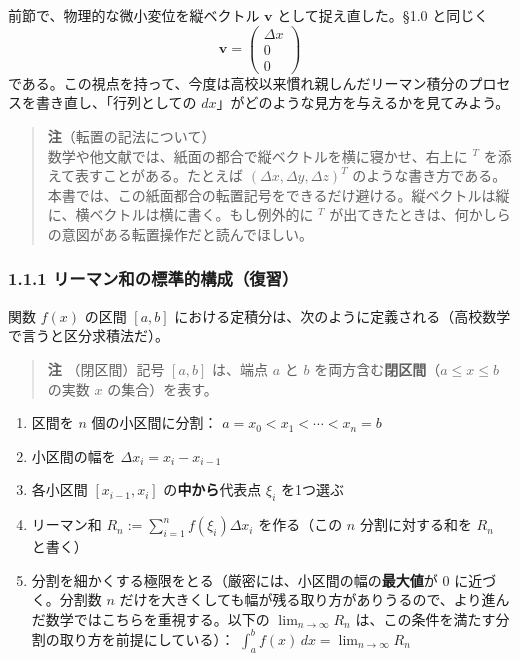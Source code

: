 \documentclass[a4paper,12pt,openany]{book}
\providecommand{\tightlist}{%
  \setlength{\itemsep}{0pt}\setlength{\parskip}{0pt}}
\begin{document}
前節で、物理的な微小変位を縦ベクトル \(\mathbf{v}\)
として捉え直した。§1.0 と同じく
\[\mathbf{v} = \begin{pmatrix} \Delta x \\ 0 \\ 0 \end{pmatrix}\]
である。この視点を持って、今度は高校以来慣れ親しんだリーマン積分のプロセスを書き直し、「行列としての
\(dx\)」がどのような見方を与えるかを見てみよう。

\begin{quote}
\textbf{注}（転置の記法について）\\
数学や他文献では、紙面の都合で縦ベクトルを横に寝かせ、右上に \({}^T\)
を添えて表すことがある。たとえば \((\Delta x,\Delta y,\Delta z)^T\)
のような書き方である。本書では、この紙面都合の転置記号をできるだけ避ける。縦ベクトルは縦に、横ベクトルは横に書く。もし例外的に
\({}^T\)
が出てきたときは、何かしらの意図がある転置操作だと読んでほしい。
\end{quote}

\hypertarget{ux30eaux30fcux30deux30f3ux548cux306eux6a19ux6e96ux7684ux69cbux6210ux5fa9ux7fd2}{%
\subsubsection{1.1.1
リーマン和の標準的構成（復習）}\label{ux30eaux30fcux30deux30f3ux548cux306eux6a19ux6e96ux7684ux69cbux6210ux5fa9ux7fd2}}

関数 \(f(x)\) の区間 \([a, b]\)
における定積分は、次のように定義される（高校数学で言うと区分求積法だ）。

\begin{quote}
\textbf{注} （閉区間）記号 \([a,b]\) は、端点 \(a\) と \(b\)
を両方含む\textbf{閉区間}（\(a \le x \le b\) の実数 \(x\)
の集合）を表す。
\end{quote}

\begin{enumerate}
\def\labelenumi{\arabic{enumi}.}
\tightlist
\item
  区間を \(n\) 個の小区間に分割： \(a = x_0 < x_1 < \cdots < x_n = b\)
\item
  小区間の幅を \(\Delta x_i = x_i - x_{i-1}\)
\item
  各小区間 \([x_{i-1}, x_i]\) の\textbf{中から}代表点 \(\xi_i\)
  を1つ選ぶ
\item
  リーマン和 \(R_n := \sum_{i=1}^n f(\xi_i) \Delta x_i\) を作る（この
  \(n\) 分割に対する和を \(R_n\) と書く）
\item
  分割を細かくする極限をとる（厳密には、小区間の幅の\textbf{最大値}が
  \(0\) に近づく。分割数 \(n\)
  だけを大きくしても幅が残る取り方がありうるので、より進んだ数学ではこちらを重視する。以下の
  \(\lim_{n\to\infty} R_n\)
  は、この条件を満たす分割の取り方を前提にしている）：
  \(\int_a^b f(x)\,dx = \lim_{n\to\infty} R_n\)
\end{enumerate}
\end{document}
